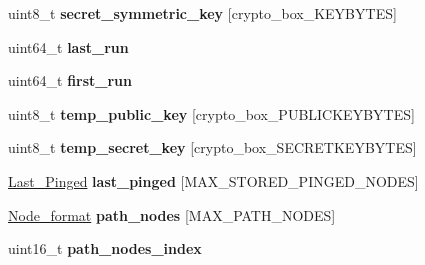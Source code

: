 \begin{DoxyCompactItemize}
\item 
\hypertarget{struct_onion___client_ab9f2ff47bc0b1e5110202a6e4be86390}{uint8\+\_\+t {\bfseries secret\+\_\+symmetric\+\_\+key} \mbox{[}crypto\+\_\+box\+\_\+\+K\+E\+Y\+B\+Y\+T\+E\+S\mbox{]}}\label{struct_onion___client_ab9f2ff47bc0b1e5110202a6e4be86390}

\item 
\hypertarget{struct_onion___client_a73e8197b772061572cb931a378ade3e4}{uint64\+\_\+t {\bfseries last\+\_\+run}}\label{struct_onion___client_a73e8197b772061572cb931a378ade3e4}

\item 
\hypertarget{struct_onion___client_abd365b47c75ee96603245d7137d6e21c}{uint64\+\_\+t {\bfseries first\+\_\+run}}\label{struct_onion___client_abd365b47c75ee96603245d7137d6e21c}

\item 
\hypertarget{struct_onion___client_afc342de3f1533c0adfd762a6fd0d20ab}{uint8\+\_\+t {\bfseries temp\+\_\+public\+\_\+key} \mbox{[}crypto\+\_\+box\+\_\+\+P\+U\+B\+L\+I\+C\+K\+E\+Y\+B\+Y\+T\+E\+S\mbox{]}}\label{struct_onion___client_afc342de3f1533c0adfd762a6fd0d20ab}

\item 
\hypertarget{struct_onion___client_a6de303feb7b7892cc6a38228554b3e78}{uint8\+\_\+t {\bfseries temp\+\_\+secret\+\_\+key} \mbox{[}crypto\+\_\+box\+\_\+\+S\+E\+C\+R\+E\+T\+K\+E\+Y\+B\+Y\+T\+E\+S\mbox{]}}\label{struct_onion___client_a6de303feb7b7892cc6a38228554b3e78}

\item 
\hypertarget{struct_onion___client_a27015cced65360814a59652b662ef143}{\hyperlink{struct_last___pinged}{Last\+\_\+\+Pinged} {\bfseries last\+\_\+pinged} \mbox{[}M\+A\+X\+\_\+\+S\+T\+O\+R\+E\+D\+\_\+\+P\+I\+N\+G\+E\+D\+\_\+\+N\+O\+D\+E\+S\mbox{]}}\label{struct_onion___client_a27015cced65360814a59652b662ef143}

\item 
\hypertarget{struct_onion___client_a1baee18cb7db8dad6b0847fa977b7f16}{\hyperlink{struct_node__format}{Node\+\_\+format} {\bfseries path\+\_\+nodes} \mbox{[}M\+A\+X\+\_\+\+P\+A\+T\+H\+\_\+\+N\+O\+D\+E\+S\mbox{]}}\label{struct_onion___client_a1baee18cb7db8dad6b0847fa977b7f16}

\item 
\hypertarget{struct_onion___client_aaeb9402a72e98e04eb5cbc4ff0aac70e}{uint16\+\_\+t {\bfseries path\+\_\+nodes\+\_\+index}}\label{struct_onion___client_aaeb9402a72e98e04eb5cbc4ff0aac70e}


\end{DoxyCompactItemize}
